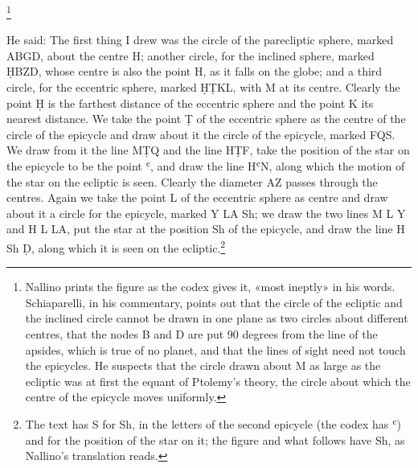 \documentclass[11pt]{article}
\begin{document}
\begin{center}
\footnote{Nallino prints the figure as the codex gives it, «most ineptly» in his words. Schiaparelli, in his commentary, points out that the circle of the ecliptic and the inclined circle cannot be drawn in one plane as two circles about different centres, that the nodes B and D are put 90 degrees from the line of the apsides, which is true of no planet, and that the lines of sight need not touch the epicycles. He suspects that the circle drawn about M as large as the ecliptic was at first the equant of Ptolemy's theory, the circle about which the centre of the epicycle moves uniformly.}\end{center}
\par He said: The first thing I drew was the circle of the parecliptic sphere, marked ABGD, about the centre H; another circle, for the inclined sphere, marked ḤBZD, whose centre is also the point H, as it falls on the globe; and a third circle, for the eccentric sphere, marked ḤṬKL, with M at its centre. Clearly the point Ḥ is the farthest distance of the eccentric sphere and the point K its nearest distance. We take the point Ṭ of the eccentric sphere as the centre of the circle of the epicycle and draw about it the circle of the epicycle, marked FQS. We draw from it the line MṬQ and the line HṬF, take the position of the star on the epicycle to be the point ʿ, and draw the line HʿN, along which the motion of the star on the ecliptic is seen. Clearly the diameter AZ passes through the centres. Again we take the point L of the eccentric sphere as centre and draw about it a circle for the epicycle, marked Y LA Sh; we draw the two lines M L Y and H L LA, put the star at the position Sh of the epicycle, and draw the line H Sh Ḍ, along which it is seen on the ecliptic.\footnote{The text has S for Sh, in the letters of the second epicycle (the codex has ʿ) and for the position of the star on it; the figure and what follows have Sh, as Nallino's translation reads.}\par
\end{document}
